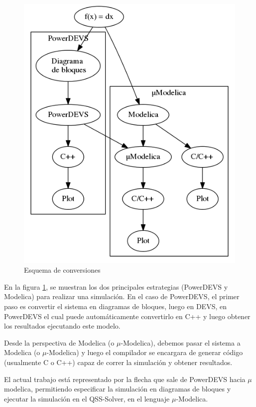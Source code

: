 \begin{figure}[H]
\centering
 \includegraphics[width=0.75\linewidth]{esquema}
 \caption{Esquema de conversiones}
 \label{fig:esquema}
\end{figure}

En la figura \ref{fig:esquema}, se muestran los dos principales estrategias (PowerDEVS\cite{BK11} y Modelica\cite{Fri98}) para realizar una simulación. En el caso de PowerDEVS, el primer paso es convertir el sistema en diagramas de bloques, luego en DEVS\cite{Zeigler}, en PowerDEVS el cual puede automáticamente convertirlo en C++ y luego obtener los resultados ejecutando este modelo. 

Desde la perspectiva de Modelica (o $\mu$-Modelica), debemos pasar el sistema a Modelica (o $\mu$-Modelica) y luego el compilador se encargara de generar código (usualmente C o C++) capaz de correr la simulación y obtener resultados.

El actual trabajo está representado por la flecha que sale de PowerDEVS hacia $\mu$modelica, permitiendo especificar la simulación en diagramas de bloques y ejecutar la simulación en el QSS-Solver, en el lenguaje $\mu$-Modelica.

